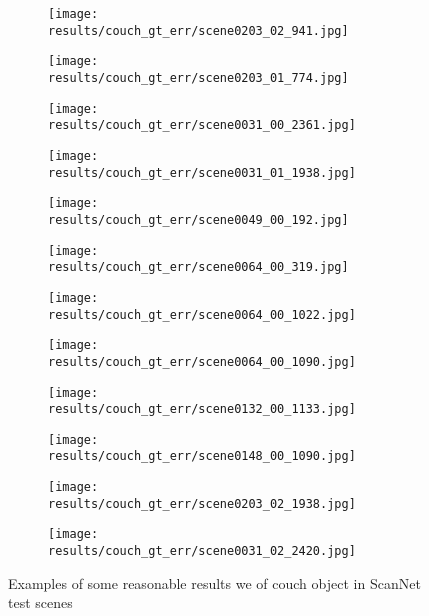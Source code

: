 \begin{figure}[h!]
  \centering
  \begin{subfigure}[b]{0.32\linewidth}
    \texttt{[image: results/couch\_gt\_err/scene0203\_02\_941.jpg]}
  \end{subfigure}
  \begin{subfigure}[b]{0.32\linewidth}
    \texttt{[image: results/couch\_gt\_err/scene0203\_01\_774.jpg]}
  \end{subfigure}
  \begin{subfigure}[b]{0.32\linewidth}
    \texttt{[image: results/couch\_gt\_err/scene0031\_00\_2361.jpg]}
  \end{subfigure}
  \begin{subfigure}[b]{0.32\linewidth}
    \texttt{[image: results/couch\_gt\_err/scene0031\_01\_1938.jpg]}
  \end{subfigure}
  \begin{subfigure}[b]{0.32\linewidth}
    \texttt{[image: results/couch\_gt\_err/scene0049\_00\_192.jpg]}
  \end{subfigure}
  \begin{subfigure}[b]{0.32\linewidth}
    \texttt{[image: results/couch\_gt\_err/scene0064\_00\_319.jpg]}
  \end{subfigure}
  \begin{subfigure}[b]{0.32\linewidth}
    \texttt{[image: results/couch\_gt\_err/scene0064\_00\_1022.jpg]}
  \end{subfigure}
  \begin{subfigure}[b]{0.32\linewidth}
    \texttt{[image: results/couch\_gt\_err/scene0064\_00\_1090.jpg]}
  \end{subfigure}
  \begin{subfigure}[b]{0.32\linewidth}
    \texttt{[image: results/couch\_gt\_err/scene0132\_00\_1133.jpg]}
  \end{subfigure}
  \begin{subfigure}[b]{0.32\linewidth}
    \texttt{[image: results/couch\_gt\_err/scene0148\_00\_1090.jpg]}
  \end{subfigure}
  \begin{subfigure}[b]{0.32\linewidth}
    \texttt{[image: results/couch\_gt\_err/scene0203\_02\_1938.jpg]}
  \end{subfigure}
  \begin{subfigure}[b]{0.32\linewidth}
    \texttt{[image: results/couch\_gt\_err/scene0031\_02\_2420.jpg]}
  \end{subfigure}
  \caption{Examples of some reasonable results we of couch object in ScanNet test scenes}
  \label{fig:result_couch_gt_err}
\end{figure}

